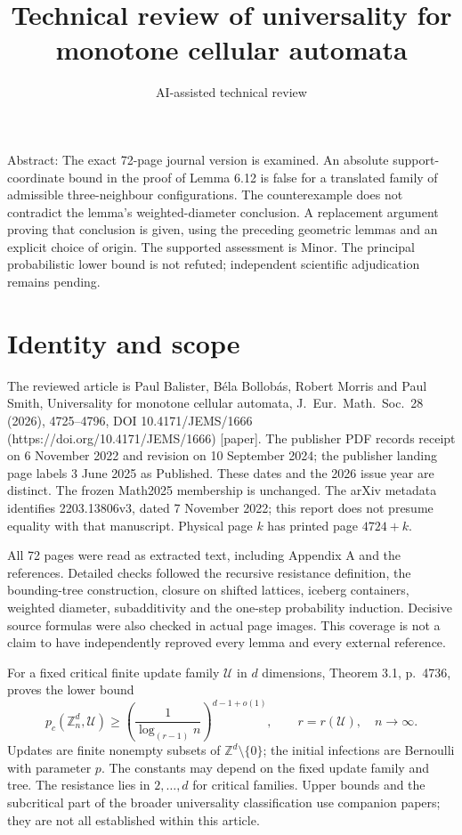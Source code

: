 \documentclass[10pt]{article}
\title{Technical review of universality for monotone cellular automata}
\author{AI-assisted technical review}
\date{}
\begin{document}
\maketitle
Abstract: The exact 72-page journal version is examined. An absolute support-coordinate bound in the proof of Lemma 6.12 is false for a translated family of admissible three-neighbour configurations. The counterexample does not contradict the lemma’s weighted-diameter conclusion. A replacement argument proving that conclusion is given, using the preceding geometric lemmas and an explicit choice of origin. The supported assessment is Minor. The principal probabilistic lower bound is not refuted; independent scientific adjudication remains pending.\par
\section*{Identity and scope}
The reviewed article is Paul Balister, Béla Bollobás, Robert Morris and Paul Smith, Universality for monotone cellular automata, J. Eur. Math. Soc. 28 (2026), 4725–4796, DOI 10.4171/JEMS/1666 (https://doi.org/10.4171/JEMS/1666) [paper]. The publisher PDF records receipt on 6 November 2022 and revision on 10 September 2024; the publisher landing page labels 3 June 2025 as Published. These dates and the 2026 issue year are distinct. The frozen Math2025 membership is unchanged. The arXiv metadata identifies 2203.13806v3, dated 7 November 2022; this report does not presume equality with that manuscript. Physical page \(k\) has printed page \(4724+k\).\par
All 72 pages were read as extracted text, including Appendix A and the references. Detailed checks followed the recursive resistance definition, the bounding-tree construction, closure on shifted lattices, iceberg containers, weighted diameter, subadditivity and the one-step probability induction. Decisive source formulas were also checked in actual page images. This coverage is not a claim to have independently reproved every lemma and every external reference.\par
For a fixed critical finite update family \(\mathcal U\) in \(d\) dimensions, Theorem 3.1, p. 4736, proves the lower bound \[p_c(\mathbb Z_n^d,\mathcal U)\ge
 \left(\frac1{\log_{(r-1)}n}\right)^{d-1+o(1)},
 \qquad r=r(\mathcal U),\quad n\longrightarrow\infty.\] Updates are finite nonempty subsets of \(\mathbb Z^d\setminus\{0\}\); the initial infections are Bernoulli with parameter \(p\). The constants may depend on the fixed update family and tree. The resistance lies in \(2,\ldots,d\) for critical families. Upper bounds and the subcritical part of the broader universality classification use companion papers; they are not all established within this article.\par
\end{document}
